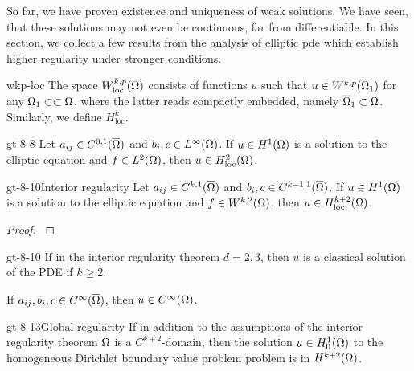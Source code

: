 \begin{intro}
  So far, we have proven existence and uniqueness of weak
  solutions. We have seen, that these solutions may not even be
  continuous, far from differentiable. In this section, we collect a
  few results from the analysis of elliptic pde which establish higher
  regularity under stronger conditions.
\end{intro}

\begin{Definition}{wkp-loc}
  The space $W^{k,p}_{\text{loc}}(\Omega)$ consists of functions $u$
  such that $u\in W^{k,p}(\Omega_1)$ for any
  $\Omega_1 \subset\subset \Omega$, where the latter reads compactly
  embedded, namely $\overline{\Omega}_1\subset\Omega$. Similarly, we
  define $H^k_{\text{loc}}$.
\end{Definition}

\begin{Theorem*}{gt-8-8}{\cite[Theorem 8.8]{GilbargTrudinger98}}
  Let $a_{ij} \in C^{0,1}(\overline{\Omega})$ and
  $b_i, c \in L^\infty(\Omega)$. If $u\in H^1(\Omega)$ is a solution
  to the elliptic equation and $f\in L^2(\Omega)$, then $u\in H^2_{\text{loc}}(\Omega)$.
\end{Theorem*}

\begin{Theorem*}{gt-8-10}{Interior regularity}
  Let $a_{ij} \in C^{k,1}(\overline{\Omega})$ and
  $b_i, c \in C^{k-1,1}(\overline{\Omega})$. If $u\in H^1(\Omega)$ is
  a solution to the elliptic equation and $f\in W^{k,2}(\Omega)$,
  then $u\in H^{k+2}_{\text{loc}}(\Omega)$.
\end{Theorem*}

\begin{proof}
  \cite[Theorem 8.10]{GilbargTrudinger98}
\end{proof}

\begin{Corollary}{gt-8-10}
  If in the interior regularity theorem $d=2,3$, then $u$ is a
  classical solution of the PDE if $k\ge 2$.

  If $a_{ij}, b_i, c \in C^{\infty}(\overline{\Omega})$, then
  $u\in C^\infty(\Omega)$.
\end{Corollary}

\begin{Theorem*}{gt-8-13}{Global regularity}
  If in addition to the assumptions of the interior regularity theorem
  $\Omega$ is a $C^{k+2}$-domain, then the solution
  $u\in H^1_0(\Omega)$ to the homogeneous Dirichlet boundary value problem 
  problem is in $H^{k+2}(\Omega)$.
\end{Theorem*}

